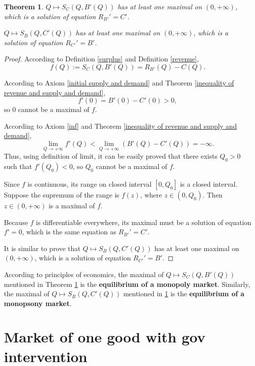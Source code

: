 \documentclass{article}
\newtheorem{theorem}{Theorem}
\begin{document}
\begin{theorem}
\label{monopoly and monopsony equilibrium}
$Q\mapsto S_C\left(Q,B'\left(Q\right)\right)$ has at least one maximal on $\left(0,+\infty\right)$, which is a solution of equation $R_{B'}'=C'$.

$Q\mapsto S_B\left(Q,C'\left(Q\right)\right)$ has at least one maximal on $\left(0,+\infty\right)$, which is a solution of equation $R_{C'}'=B'$.
\end{theorem}
\begin{proof}
According to Definition \ref{surplus} and Definition \ref{revenue},
$$f\left(Q\right):=S_C\left(Q,B'\left(Q\right)\right)=R_{B'}\left(Q\right)-C\left(Q\right).$$

According to Axiom \ref{initial supply and demand} and Theorem \ref{inequality of revenue and supply and demand},
$$f'\left(0\right)=B'\left(0\right)-C'\left(0\right)>0,$$
so $0$ cannot be a maximal of $f$.

According to Axiom \ref{inf} and Theorem \ref{inequality of revenue and supply and demand},
$$\lim_{Q\to+\infty}f'\left(Q\right)<\lim_{Q\to+\infty}\left(B'\left(Q\right)-C'\left(Q\right)\right)=-\infty.$$
Thus, using definition of limit, it can be easily proved that there exists $Q_0>0$ such that $f'\left(Q_0\right)<0$,
so $Q_0$ cannot be a maximal of $f$.

Since $f$ is continuous, its range on closed interval $\left[0,Q_0\right]$ is a closed interval.
Suppose the supremum of the range is $f\left(z\right)$, where $z\in\left(0,Q_0\right)$.
Then $z\in\left(0,+\infty\right)$ is a maximal of $f$.

Because $f$ is differentiable everywhere, its maximal must be a solution of equation $f'=0$,
which is the same equation as $R_{B'}'=C'$.

It is similar to prove that $Q\mapsto S_B\left(Q,C'\left(Q\right)\right)$ has at least one maximal on $\left(0,+\infty\right)$, which is a solution of equation $R_{C'}'=B'$.
\end{proof}

According to principles of economics,
the maximal of $Q\mapsto S_C\left(Q,B'\left(Q\right)\right)$ mentioned in Theorem \ref{monopoly and monopsony equilibrium}
is the \textbf{equilibrium of a monopoly market}.
Similarly, the maximal of $Q\mapsto S_B\left(Q,C'\left(Q\right)\right)$ mentioned in \ref{monopoly and monopsony equilibrium}
is the \textbf{equilibrium of a monopsony market}.

\section{Market of one good with gov intervention}
\end{document}

